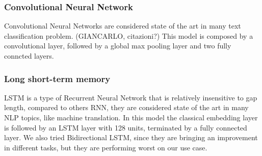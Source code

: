 \subsubsection{Convolutional Neural Network}
Convolutional Neural Networks are considered state of the art in many text classification problem. (GIANCARLO, citazioni?)
This model is composed by a convolutional layer, followed by a global max pooling layer and two fully conncted layers.

\subsubsection{Long short-term memory}
LSTM is a type of Recurrent Neural Network that is relatively insensitive to gap length, compared to others RNN, they are considered state of the art in many NLP topics, like machine translation.
In this model the classical embedding layer is followed by an LSTM layer with 128 units, terminated by a fully connected layer.
We also tried Bidirectional LSTM, since they are bringing an improvement in different tasks, but they are performing worst on our use case.

